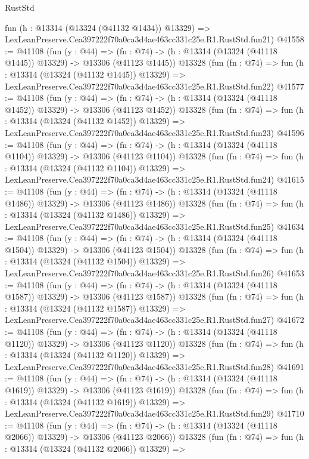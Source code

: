 \begin{lexlean}{RustStd}
\begin{coremodule}
    fun (h : @13314 (@13324 (@41132 @1434)) @13329) =>
    LexLeanPreserve.Cea397222f70a0ca3d4ae463cc331c25e.R1.RustStd.fun21)
@41558 := @41108
    (fun (y : @44) =>
    (fn : @74) -> (h : @13314 (@13324 (@41118 @1445)) @13329) -> @13306 (@41123 @1445))
    @13328
    (fun (fn : @74) =>
    fun (h : @13314 (@13324 (@41132 @1445)) @13329) =>
    LexLeanPreserve.Cea397222f70a0ca3d4ae463cc331c25e.R1.RustStd.fun22)
@41577 := @41108
    (fun (y : @44) =>
    (fn : @74) -> (h : @13314 (@13324 (@41118 @1452)) @13329) -> @13306 (@41123 @1452))
    @13328
    (fun (fn : @74) =>
    fun (h : @13314 (@13324 (@41132 @1452)) @13329) =>
    LexLeanPreserve.Cea397222f70a0ca3d4ae463cc331c25e.R1.RustStd.fun23)
@41596 := @41108
    (fun (y : @44) =>
    (fn : @74) -> (h : @13314 (@13324 (@41118 @1104)) @13329) -> @13306 (@41123 @1104))
    @13328
    (fun (fn : @74) =>
    fun (h : @13314 (@13324 (@41132 @1104)) @13329) =>
    LexLeanPreserve.Cea397222f70a0ca3d4ae463cc331c25e.R1.RustStd.fun24)
@41615 := @41108
    (fun (y : @44) =>
    (fn : @74) -> (h : @13314 (@13324 (@41118 @1486)) @13329) -> @13306 (@41123 @1486))
    @13328
    (fun (fn : @74) =>
    fun (h : @13314 (@13324 (@41132 @1486)) @13329) =>
    LexLeanPreserve.Cea397222f70a0ca3d4ae463cc331c25e.R1.RustStd.fun25)
@41634 := @41108
    (fun (y : @44) =>
    (fn : @74) -> (h : @13314 (@13324 (@41118 @1504)) @13329) -> @13306 (@41123 @1504))
    @13328
    (fun (fn : @74) =>
    fun (h : @13314 (@13324 (@41132 @1504)) @13329) =>
    LexLeanPreserve.Cea397222f70a0ca3d4ae463cc331c25e.R1.RustStd.fun26)
@41653 := @41108
    (fun (y : @44) =>
    (fn : @74) -> (h : @13314 (@13324 (@41118 @1587)) @13329) -> @13306 (@41123 @1587))
    @13328
    (fun (fn : @74) =>
    fun (h : @13314 (@13324 (@41132 @1587)) @13329) =>
    LexLeanPreserve.Cea397222f70a0ca3d4ae463cc331c25e.R1.RustStd.fun27)
@41672 := @41108
    (fun (y : @44) =>
    (fn : @74) -> (h : @13314 (@13324 (@41118 @1120)) @13329) -> @13306 (@41123 @1120))
    @13328
    (fun (fn : @74) =>
    fun (h : @13314 (@13324 (@41132 @1120)) @13329) =>
    LexLeanPreserve.Cea397222f70a0ca3d4ae463cc331c25e.R1.RustStd.fun28)
@41691 := @41108
    (fun (y : @44) =>
    (fn : @74) -> (h : @13314 (@13324 (@41118 @1619)) @13329) -> @13306 (@41123 @1619))
    @13328
    (fun (fn : @74) =>
    fun (h : @13314 (@13324 (@41132 @1619)) @13329) =>
    LexLeanPreserve.Cea397222f70a0ca3d4ae463cc331c25e.R1.RustStd.fun29)
@41710 := @41108
    (fun (y : @44) =>
    (fn : @74) -> (h : @13314 (@13324 (@41118 @2066)) @13329) -> @13306 (@41123 @2066))
    @13328
    (fun (fn : @74) =>
    fun (h : @13314 (@13324 (@41132 @2066)) @13329) =>

\end{coremodule}
\end{lexlean}
